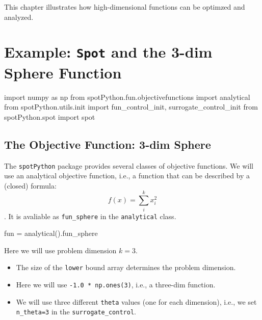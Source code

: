 \documentclass[
  letterpaper,
  DIV=11,
  numbers=noendperiod]{scrreprt}
\newenvironment{Shaded}{\begin{snugshade}}{\end{snugshade}}
\newcommand{\ImportTok}[1]{\textcolor[rgb]{0.00,0.46,0.62}{#1}}
\newcommand{\NormalTok}[1]{\textcolor[rgb]{0.00,0.23,0.31}{#1}}
\newcommand{\OperatorTok}[1]{\textcolor[rgb]{0.37,0.37,0.37}{#1}}
\providecommand{\tightlist}{%
  \setlength{\itemsep}{0pt}\setlength{\parskip}{0pt}}\usepackage{longtable,booktabs,array}
\begin{document}
This chapter illustrates how high-dimensional functions can be optimzed
and analyzed.

\section{\texorpdfstring{Example: \texttt{Spot} and the 3-dim Sphere
Function}{Example: Spot and the 3-dim Sphere Function}}\label{example-spot-and-the-3-dim-sphere-function}

\begin{Shaded}
\begin{Highlighting}[]
\ImportTok{import}\NormalTok{ numpy }\ImportTok{as}\NormalTok{ np}
\ImportTok{from}\NormalTok{ spotPython.fun.objectivefunctions }\ImportTok{import}\NormalTok{ analytical}
\ImportTok{from}\NormalTok{ spotPython.utils.init }\ImportTok{import}\NormalTok{ fun\_control\_init, surrogate\_control\_init}
\ImportTok{from}\NormalTok{ spotPython.spot }\ImportTok{import}\NormalTok{ spot}
\end{Highlighting}
\end{Shaded}

\subsection{The Objective Function: 3-dim
Sphere}\label{the-objective-function-3-dim-sphere}

The \texttt{spotPython} package provides several classes of objective
functions. We will use an analytical objective function, i.e., a
function that can be described by a (closed) formula:
\[f(x) = \sum_i^k x_i^2 \]. It is avaliable as \texttt{fun\_sphere} in
the \texttt{analytical} class.

\begin{Shaded}
\begin{Highlighting}[]
\NormalTok{fun }\OperatorTok{=}\NormalTok{ analytical().fun\_sphere}
\end{Highlighting}
\end{Shaded}

Here we will use problem dimension \(k=3\).

\begin{itemize}
\tightlist
\item
  The size of the \texttt{lower} bound array determines the problem
  dimension.
\item
  Here we will use \texttt{-1.0\ *\ np.ones(3)}, i.e., a three-dim
  function.
\item
  We will use three different \texttt{theta} values (one for each
  dimension), i.e., we set \texttt{n\_theta=3} in the
  \texttt{surrogate\_control}.
\end{itemize}
\end{document}
